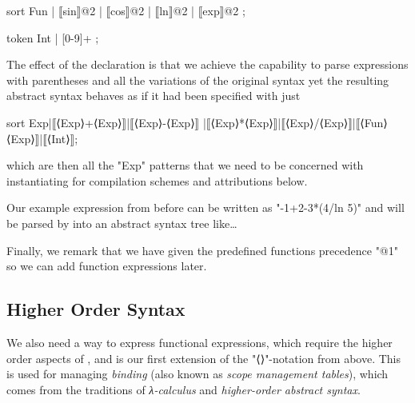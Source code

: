 \documentclass[11pt]{article} %
\begin{document}
\begin{example}
\begin{code}
sort Fun
| ⟦sin⟧@2 | ⟦cos⟧@2 | ⟦ln⟧@2 | ⟦exp⟧@2 ;

token Int | [0-9]+ ;
\end{code}
  The effect of the declaration is that we achieve the capability to parse expressions with
  parentheses and all the variations of the original syntax yet the resulting abstract syntax
  behaves as if it had been specified with just
\begin{code}[numbers=none]
sort Exp|⟦⟨Exp⟩+⟨Exp⟩⟧|⟦⟨Exp⟩-⟨Exp⟩⟧
|⟦⟨Exp⟩*⟨Exp⟩⟧|⟦⟨Exp⟩/⟨Exp⟩⟧|⟦⟨Fun⟩⟨Exp⟩⟧|⟦⟨Int⟩⟧;
\end{code}
  which are then all the "Exp" patterns that we need to be concerned with instantiating for
  compilation schemes and attributions below.

  Our example expression from before can be written as "-1+2-3*(4/ln 5)" and will be parsed by \HAX
  into an abstract syntax tree like…\TBD

  Finally, we remark that we have given the predefined functions precedence "@1" so we can add
  function expressions later.
\end{example}

\subsection{Higher Order Syntax}
\label{sec:hos}

We also need a way to express functional expressions, which require the higher order aspects of
\HAX, and is our first extension of the "⟨⟩"-notation from above.  This is used for managing
\emph{binding} (also known as \emph{scope management tables}), which comes from the traditions of
\emph{λ-calculus} and \emph{higher-order abstract syntax}.
\end{document}
